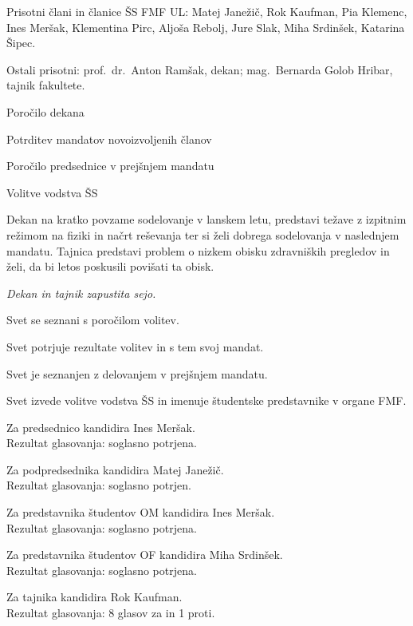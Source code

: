 \documentclass{seja}
\begin{document}
Prisotni člani in članice ŠS FMF UL:
Matej Janežič,
Rok Kaufman,
Pia Klemenc,
Ines Meršak,
Klementina Pirc,
Aljoša Rebolj,
Jure Slak,
Miha Srdinšek,
Katarina Šipec.

Ostali prisotni: prof.~dr.~Anton Ramšak, dekan; mag.~Bernarda Golob Hribar, tajnik fakultete.

\begin{red*}
	\item Poročilo dekana
	\item Potrditev mandatov novoizvoljenih članov
	\item Poročilo predsednice v prejšnjem mandatu
	\item Volitve vodstva ŠS
\end{red*}

\begin{ad}
	\item
	Dekan na kratko povzame sodelovanje v lanskem letu, predstavi težave z izpitnim režimom na fiziki in načrt reševanja ter si želi dobrega sodelovanja v naslednjem mandatu. Tajnica predstavi problem o nizkem obisku zdravniških pregledov in želi, da bi letos poskusili povišati ta obisk.

	\textit{Dekan in tajnik zapustita sejo.}

	\item
	Svet se seznani s poročilom volitev.
	\begin{sklep*}
		Svet potrjuje rezultate volitev in s tem svoj mandat.
	\end{sklep*}

	\item
	Svet je seznanjen z delovanjem v prejšnjem mandatu.

	\item
	Svet izvede volitve vodstva ŠS in imenuje študentske predstavnike v organe FMF.

	Za predsednico kandidira Ines Meršak.\\
	Rezultat glasovanja: soglasno potrjena.

	Za podpredsednika kandidira Matej Janežič.\\
	Rezultat glasovanja: soglasno potrjen.

	Za predstavnika študentov OM kandidira Ines Meršak.\\
	Rezultat glasovanja: soglasno potrjena.

	Za predstavnika študentov OF kandidira Miha Srdinšek.\\
	Rezultat glasovanja: soglasno potrjena.

	Za tajnika kandidira Rok Kaufman. \\
	Rezultat glasovanja: 8 glasov za in 1 proti.


\end{ad}
\end{document}
